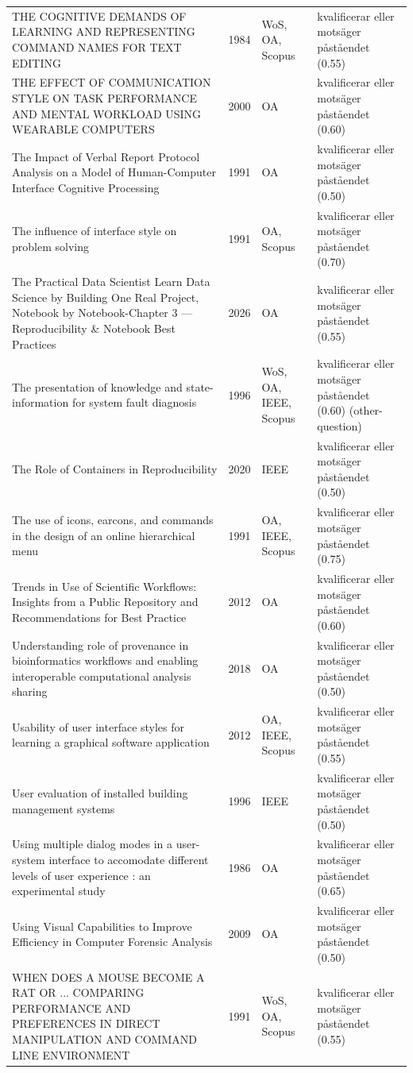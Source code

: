 \begin{longtable}{@{}%
  >{\raggedright\arraybackslash}p{}c%
  >{\raggedright\arraybackslash}p{}%
  >{\raggedright\arraybackslash}p{}@{}}
THE COGNITIVE DEMANDS OF LEARNING AND REPRESENTING COMMAND NAMES FOR TEXT EDITING & 1984 & WoS, OA, Scopus & kvalificerar eller motsäger påståendet (0.55) \\
THE EFFECT OF COMMUNICATION STYLE ON TASK PERFORMANCE AND MENTAL WORKLOAD USING WEARABLE COMPUTERS & 2000 & OA & kvalificerar eller motsäger påståendet (0.60) \\
The Impact of Verbal Report Protocol Analysis on a Model of Human-Computer Interface Cognitive Processing & 1991 & OA & kvalificerar eller motsäger påståendet (0.50) \\
The influence of interface style on problem solving & 1991 & OA, Scopus & kvalificerar eller motsäger påståendet (0.70) \\
The Practical Data Scientist Learn Data Science by Building One Real Project, Notebook by Notebook-Chapter 3 --- Reproducibility \& Notebook Best Practices & 2026 & OA & kvalificerar eller motsäger påståendet (0.55) \\
The presentation of knowledge and state-information for system fault diagnosis & 1996 & WoS, OA, IEEE, Scopus & kvalificerar eller motsäger påståendet (0.60) (other-question) \\
The Role of Containers in Reproducibility & 2020 & IEEE & kvalificerar eller motsäger påståendet (0.50) \\
The use of icons, earcons, and commands in the design of an online hierarchical menu & 1991 & OA, IEEE, Scopus & kvalificerar eller motsäger påståendet (0.75) \\
Trends in Use of Scientific Workflows: Insights from a Public Repository and Recommendations for Best Practice & 2012 & OA & kvalificerar eller motsäger påståendet (0.60) \\
Understanding role of provenance in bioinformatics workflows and enabling interoperable computational analysis sharing & 2018 & OA & kvalificerar eller motsäger påståendet (0.50) \\
Usability of user interface styles for learning a graphical software application & 2012 & OA, IEEE, Scopus & kvalificerar eller motsäger påståendet (0.55) \\
User evaluation of installed building management systems & 1996 & IEEE & kvalificerar eller motsäger påståendet (0.50) \\
Using multiple dialog modes in a user-system interface to accomodate different levels of user experience : an experimental study & 1986 & OA & kvalificerar eller motsäger påståendet (0.65) \\
Using Visual Capabilities to Improve Efficiency in Computer Forensic Analysis & 2009 & OA & kvalificerar eller motsäger påståendet (0.50) \\
WHEN DOES A MOUSE BECOME A RAT OR ... COMPARING PERFORMANCE AND PREFERENCES IN DIRECT MANIPULATION AND COMMAND LINE ENVIRONMENT & 1991 & WoS, OA, Scopus & kvalificerar eller motsäger påståendet (0.55) \\
\end{longtable}
\endgroup
